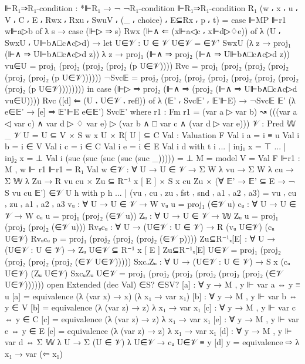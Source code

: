 \begin{spverbatim}
  ⊩R₁⇒R₁-condition : *⊩R₁ → ¬ ¬R₁-condition
  ⊩R₁⇒R₁-condition R₁ (w ⸴ x ⸴ u ⸴ V ⸴ C ⸴ E ⸴ Rwx ⸴ Rxu ⸴ SwuV ⸴ (_ ⸴ choice) ⸴ E⊆Rx ⸴ p ⸴ t)
    = case ⊩MP ⊩r1 w⊩a▷b of λ { s → case (⊩▷ ⇒ s) Rwx (⊩∧ ⇐ (x⊩a◁c ⸴ x⊩d▷♢e)) of
    λ { (U ⸴ SwxU ⸴ U⊩b∧□c∧c▷d) →
      let
        U∈𝒱 : U ∈ 𝒱
        U∈𝒱 = ∈𝒱' SwxU
                (λ z → proj₁ (⊩∧ ⇒ U⊩b∧□c∧c▷d z))
                λ z → proj₁ (⊩∧ ⇒ proj₂  (⊩∧ ⇒ U⊩b∧□c∧c▷d z))
        vu∈U = proj₁ (proj₂ (proj₂ (proj₂ (p U∈𝒱))))
        Rvc = proj₁ (proj₂ (proj₂ (proj₂ (proj₂ (proj₂ (p U∈𝒱))))))
        ¬Svc𝔼 = proj₂ (proj₂ (proj₂ (proj₂ (proj₂ (proj₂ (proj₂ (proj₂ (p U∈𝒱))))))))
      in
        case (⊩▷ ⇒ proj₂ (⊩∧ ⇒ (proj₂ (⊩∧ ⇒ U⊩b∧□c∧c▷d vu∈U)))) Rvc
          ([d] ⇐ (U ⸴ U∈𝒱 ⸴ refl)) of
          λ { (𝔼' ⸴ Svc𝔼' ⸴ 𝔼'⊩E) → ¬Svc𝔼 𝔼' (λ {e∈𝔼' → [e] ⇒ 𝔼'⊩E e∈𝔼'}) Svc𝔼'}}}
    where
    r1 : Fm
    r1 = (var a ▷ var b) ↝ (((var a ◁ var c) ∧ var d ▷ ♢ var e)
      ▷ (var b ∧ □ var c ∧ (var d ▷ var e)))
    𝒱 : Pred 𝕎 _
    𝒱 U = U ⊆ V × S w x U × R[ U ] ⊆ C
    Val : Valuation F
    Val i a = i ≡ u
    Val i b = i ∈ V
    Val i c = i ∈ C
    Val i e = i ∈ E
    Val i d with t i
    ... | inj₁ x = ⊤
    ... | inj₂ x = ⊥
    Val i (suc (suc (suc (suc (suc _))))) = ⊥
    M = model {V = Val} F
    ⊩r1 : M , w ⊩ r1
    ⊩r1 = R₁ Val w
    ∈𝒱 : ∀ {U} → U ∈ 𝒱 → Σ W λ vu → Σ W λ cu → Σ 𝕎 λ Zu
      → R vu cu × Zu ⊆ R⁻¹ x [ E ] × S x cu Zu
      × (∀ 𝔼' → 𝔼' ⊆ E → ¬ S vu cu 𝔼')
    ∈𝒱 {U} h with p h
    ... | (vu ⸴ cu ⸴ zu ⸴ fst ⸴ snd ⸴ a1 ⸴ a2 ⸴ a3) = vu ⸴ cu ⸴ zu ⸴ a1 ⸴ a2 ⸴ a3
    vᵤ : ∀ {U} → U ∈ 𝒱 → W
    vᵤ u = proj₁ (∈𝒱 u)
    cᵤ : ∀ {U} → U ∈ 𝒱 → W
    cᵤ u = proj₁ (proj₂ (∈𝒱 u))
    Zᵤ : ∀ {U} → U ∈ 𝒱 → 𝕎
    Zᵤ u = proj₁ (proj₂ (proj₂ (∈𝒱 u)))
    Rvᵤcᵤ : ∀ {U} → (U∈𝒱 : U ∈ 𝒱) → R (vᵤ U∈𝒱) (cᵤ U∈𝒱)
    Rvᵤcᵤ p = proj₁ (proj₂ (proj₂ (proj₂ (∈𝒱 p))))
    Zu⊆R⁻¹ₓ[E] : ∀ {U} → (U∈𝒱 : U ∈ 𝒱) → Zᵤ U∈𝒱 ⊆ R⁻¹ x [ E ]
    Zu⊆R⁻¹ₓ[E] U∈𝒱 = proj₁ (proj₂ (proj₂ (proj₂ (proj₂ (∈𝒱 U∈𝒱)))))
    SxcᵤZᵤ : ∀ {U} → (U∈𝒱 : U ∈ 𝒱) → S x (cᵤ U∈𝒱) (Zᵤ U∈𝒱)
    SxcᵤZᵤ U∈𝒱 = proj₁ (proj₂ (proj₂ (proj₂ (proj₂ (proj₂ (∈𝒱 U∈𝒱))))))
    open Extended (dec Val) ∈S? ∈SV?
    [a] : ∀ {y} → M , y ⊩ var a ⇔ y ≡ u
    [a] = equivalence (λ {(var x) → x}) (λ x₁ → var x₁)
    [b] : ∀ {y} → M , y ⊩ var b ⇔ y ∈ V
    [b] = equivalence (λ {(var z) → z}) λ x₁ → var x₁
    [c] : ∀ {y} → M , y ⊩ var c ⇔ y ∈ C
    [c] = equivalence (λ {(var z) → z}) λ x₁ → var x₁
    [e] : ∀ {y} → M , y ⊩ var e ⇔ y ∈ E
    [e] = equivalence (λ {(var z) → z}) λ x₁ → var x₁
    [d] : ∀ {y} → M , y ⊩ var d ⇔ Σ 𝕎 λ U → Σ (U ∈ 𝒱) λ U∈𝒱 → cᵤ U∈𝒱 ≡ y
    [d] {y} = equivalence ⇨ λ x₁ → var (⇦ x₁)

\end{spverbatim}
